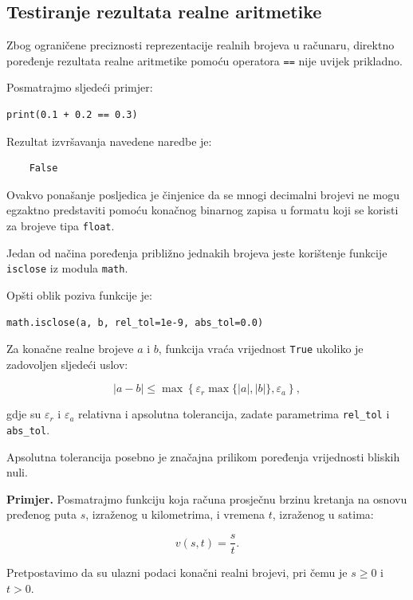 \subsection{Testiranje rezultata realne aritmetike}

Zbog ograničene preciznosti reprezentacije realnih 
brojeva u računaru, direktno poređenje rezultata 
realne aritmetike pomoću operatora \texttt{==} 
nije uvijek prikladno.

Posmatrajmo sljedeći primjer:

\begin{verbatim}
print(0.1 + 0.2 == 0.3)
\end{verbatim}

Rezultat izvršavanja navedene naredbe je:

\begin{verbatim}
	False
\end{verbatim}

Ovakvo ponašanje posljedica je činjenice da se mnogi 
decimalni brojevi ne mogu egzaktno predstaviti 
pomoću konačnog binarnog zapisa u formatu koji se 
koristi za brojeve tipa \texttt{float}.

Jedan od načina poređenja približno jednakih brojeva 
jeste korištenje funkcije \texttt{isclose} iz modula 
\texttt{math}.

Opšti oblik poziva funkcije je:

\begin{verbatim}
math.isclose(a, b, rel_tol=1e-9, abs_tol=0.0)
\end{verbatim}

Za konačne realne brojeve $a$ i $b$, funkcija vraća 
vrijednost \texttt{True} ukoliko je zadovoljen 
sljedeći uslov:

\[
|a-b|
\leq
\max\left\{
\varepsilon_r\max\{|a|,|b|\},
\varepsilon_a
\right\},
\]

gdje su $\varepsilon_r$ i $\varepsilon_a$ relativna 
i apsolutna tolerancija, zadate parametrima 
\texttt{rel\_tol} i \texttt{abs\_tol}.

Apsolutna tolerancija posebno je značajna prilikom 
poređenja vrijednosti bliskih nuli.

\textbf{Primjer.} Posmatrajmo funkciju koja računa 
prosječnu brzinu kretanja na osnovu pređenog puta 
$s$, izraženog u kilometrima, i vremena $t$, 
izraženog u satima:

\[
v(s,t)=\frac{s}{t}.
\]

Pretpostavimo da su ulazni podaci konačni realni 
brojevi, pri čemu je $s\geq 0$ i $t>0$.

